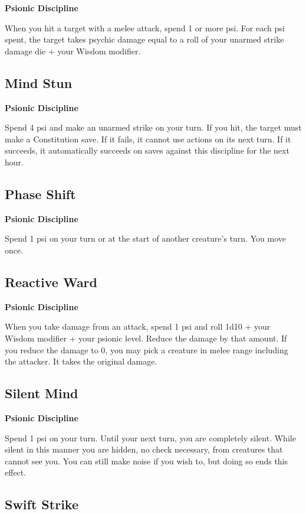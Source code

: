 \documentclass[12pt,letterpaper,twocolumn,openany,nodeprecatedcode,bg=none]{dndbook}
\begin{document}
\textbf{Psionic Discipline}

When you hit a target with a melee attack, spend 1 or more psi. For each
psi spent, the target takes psychic damage equal to a roll of your
unarmed strike damage die + your Wisdom modifier.

\subsection{Mind Stun}\label{mind-stun}

\textbf{Psionic Discipline}

Spend 4 psi and make an unarmed strike on your turn. If you hit, the
target must make a Constitution save. If it fails, it cannot use actions
on its next turn. If it succeeds, it automatically succeeds on saves
against this discipline for the next hour.

\subsection{Phase Shift}\label{phase-shift}

\textbf{Psionic Discipline}

Spend 1 psi on your turn or at the start of another creature's turn. You
move once.

\subsection{Reactive Ward}\label{reactive-ward}

\textbf{Psionic Discipline}

When you take damage from an attack, spend 1 psi and roll 1d10 + your
Wisdom modifier + your psionic level. Reduce the damage by that amount.
If you reduce the damage to 0, you may pick a creature in melee range
including the attacker. It takes the original damage.

\subsection{Silent Mind}\label{silent-mind}

\textbf{Psionic Discipline}

Spend 1 psi on your turn. Until your next turn, you are completely
silent. While silent in this manner you are hidden, no check necessary,
from creatures that cannot see you. You can still make noise if you wish
to, but doing so ends this effect.

\subsection{Swift Strike}\label{swift-strike}
\end{document}
